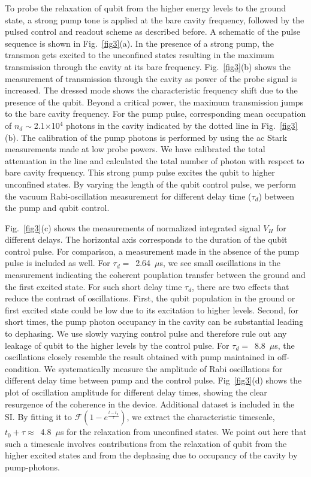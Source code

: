 \documentclass[a4paper, amsfonts, amssymb, amsmath, reprint,showkeys,nofootinbib,superscriptaddress]{revtex4-2}
\begin{document}
%
To probe the relaxation of qubit from the higher energy levels to the
ground state, a strong pump tone is applied at the bare cavity frequency, followed by 
the pulsed control and readout scheme as described before. A schematic of the pulse sequence is
shown in Fig.~\ref{fig3}(a).
%
In the presence of a strong pump, the transmon gets excited to the 
unconfined states resulting in the maximum 
transmission through the cavity at its bare frequency. 
%
Fig.~\ref{fig3}(b) shows the measurement of transmission 
through the cavity as power of the probe signal is increased. 
%
The dressed mode shows the characteristic frequency shift due to the presence of 
the qubit. Beyond a critical power, the maximum transmission 
jumps to the bare cavity frequency.
%
For the pump pulse, corresponding mean occupation of $n_d\sim$2.1$\times$10$^4$
photons in the cavity indicated by the dotted line in Fig.~\ref{fig3}(b).
%
The calibration of the pump photons is performed by using the ac Stark measurements made at
low probe powers. We have calibrated the total attenuation in the line and calculated the 
total number of photon with respect to bare cavity frequency.
%
This strong pump pulse excites the qubit to higher unconfined states. By varying the
length of the qubit control pulse, we perform the vacuum Rabi-oscillation 
measurement for different delay time ($\tau_{d}$) between the pump and qubit 
control.






Fig.~\ref{fig3}(c) shows the measurements of normalized integrated signal $V_H$
for different delays. The horizontal axis corresponds to the 
duration of the qubit control pulse. For comparison, a measurement made
in the absence of the pump pulse is included as well.
%
For $\tau_d=$~2.64~$\mu$s, we see small oscillations in the measurement 
indicating the coherent pouplation transfer between the ground and the first excited 
state. 
%
For such short delay time $\tau_d$, there are two effects that reduce the 
contrast of oscillations. First, the qubit population in the ground 
or first excited state could be low due to its excitation to higher
levels. Second, for short times, the pump photon occupancy in the
cavity can be substantial leading to dephasing.
We use slowly varying control pulse and therefore rule out any 
leakage of qubit to the higher levels by the control pulse. 
For $\tau_d=$~8.8~$\mu$s, the oscillations closely resemble the result 
obtained with pump maintained in off-condition.
%
We systematically measure the amplitude of Rabi oscillations 
for different delay time between pump and the control pulse. Fig~\ref{fig3}(d) 
shows the plot of oscillation amplitude for different delay times, showing the 
clear resurgence of the coherence in the device.
Additional dataset is included in the SI.
By fitting it to $\mathcal{F} (1 - e^\frac{t-t_0}{\tau})$, we extract the characteristic timescale, 
$t_0+\tau \approx$~4.8~$\mu$s for the relaxation from unconfined states.
We point out here that such a timescale involves contributions from the
relaxation of qubit from the higher excited states and 
from the dephasing due to occupancy of the cavity by pump-photons.
\end{document}
